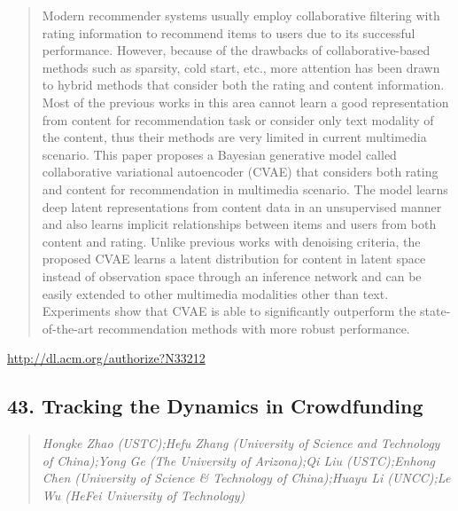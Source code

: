 \documentclass{article}
\begin{document}
\begin{quote}
Modern recommender systems usually employ collaborative filtering with rating information to recommend items to users due to its successful performance. However, because of the drawbacks of collaborative-based methods such as sparsity, cold start, etc., more attention has been drawn to hybrid methods that consider both the rating and content information. Most of the previous works in this area cannot learn a good representation from content for recommendation task or consider only text modality of the content, thus their methods are very limited in current multimedia scenario. This paper proposes a Bayesian generative model called collaborative variational autoencoder (CVAE) that considers both rating and content for recommendation in multimedia scenario. The model learns deep latent representations from content data in an unsupervised manner and also learns implicit relationships between items and users from both content and rating. Unlike previous works with denoising criteria, the proposed CVAE learns a latent distribution for content in latent space instead of observation space through an inference network and can be easily extended to other multimedia modalities other than text. Experiments show that CVAE is able to significantly outperform the state-of-the-art recommendation methods with more robust performance.
\end{quote}

\href{http://dl.acm.org/authorize?N33212}{http://dl.acm.org/authorize?N33212}

\subsection{43. Tracking the Dynamics in Crowdfunding}

\begin{quote}
\footnotesize{\textit{Hongke Zhao (USTC);Hefu Zhang (University of Science and Technology of China);Yong Ge (The University of Arizona);Qi Liu (USTC);Enhong Chen (University of Science \& Technology of China);Huayu Li (UNCC);Le Wu (HeFei University of Technology)}}

\end{quote}
\end{document}
